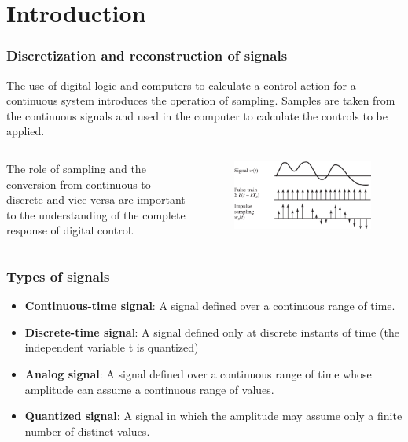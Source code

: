 \section{Introduction}

\begin{frame}
	\frametitle{Discretization and reconstruction of signals}
	\begin{definition}
	The use of digital logic and computers to calculate a control action for a continuous system introduces the operation of sampling. Samples are taken from the continuous signals and used in the computer to calculate the controls to be applied.\\
	\end{definition}
	\vspace{1em}
	\begin{columns}
		\begin{column}{0.5\textwidth}
			The role of sampling and the conversion from continuous to discrete and vice versa are important to the understanding of the complete response of digital control.
		\end{column}
		\begin{column}{0.5\textwidth}
			\vspace{-0.8em}
			\begin{figure}
			\centering
			\includegraphics[width=1\linewidth]{discretization}
			\end{figure}
		\end{column}
	\end{columns}
\end{frame}

\begin{frame}
	\frametitle{Types of signals}
	\begin{itemize}
		\item \textbf{Continuous-time signal}: A signal defined over a continuous range of time.
		\item \textbf{Discrete-time signa}l: A signal defined only at discrete instants of time (the independent variable t is quantized)
		\item \textbf{Analog signal}: A signal defined over a continuous range of time whose amplitude can assume a continuous range of values.
		\item \textbf{Quantized signal}: A signal in which the amplitude may assume only a finite number of distinct values.
	\end{itemize}
\end{frame}

